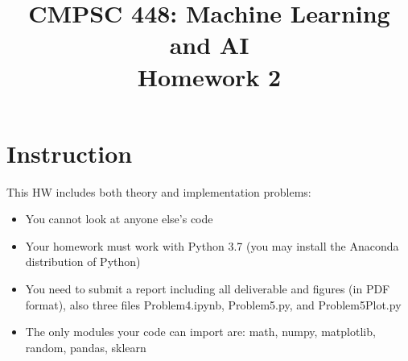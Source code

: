 \documentclass[11pt]{article}
\title{CMPSC 448: Machine Learning and AI \\ Homework 2}
\author{}
\date{}
\theoremstyle{quest}
\begin{document}
\maketitle

\section*{Instruction}

This HW includes both theory and implementation problems:
\begin{itemize}
    \item You cannot look at anyone else's code
    \item Your homework must work with Python 3.7 (you may install the Anaconda distribution of Python)
    \item You need to submit a report including all deliverable and figures (in PDF format), also three files \textsf{Problem4.ipynb}, \textsf{Problem5.py}, and \textsf{Problem5Plot.py}
    \item The only modules your code can import are: \textsf{math}, \textsf{numpy}, \textsf{matplotlib}, \textsf{random}, \textsf{pandas}, \textsf{sklearn}
\end{itemize}
\end{document}
